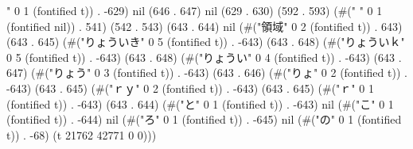 " 0 1 (fontified t)) . -629) nil (646 . 647) nil (629 . 630) (592 . 593) (#(" " 0 1 (fontified nil)) . 541) (542 . 543) (643 . 644) nil (#("領域" 0 2 (fontified t)) . 643) (643 . 645) (#("りょういき" 0 5 (fontified t)) . -643) (643 . 648) (#("りょういｋ" 0 5 (fontified t)) . -643) (643 . 648) (#("りょうい" 0 4 (fontified t)) . -643) (643 . 647) (#("りょう" 0 3 (fontified t)) . -643) (643 . 646) (#("りょ" 0 2 (fontified t)) . -643) (643 . 645) (#("ｒｙ" 0 2 (fontified t)) . -643) (643 . 645) (#("ｒ" 0 1 (fontified t)) . -643) (643 . 644) (#("と" 0 1 (fontified t)) . -643) nil (#("こ" 0 1 (fontified t)) . -644) nil (#("ろ" 0 1 (fontified t)) . -645) nil (#("の" 0 1 (fontified t)) . -68) (t 21762 42771 0 0)))
